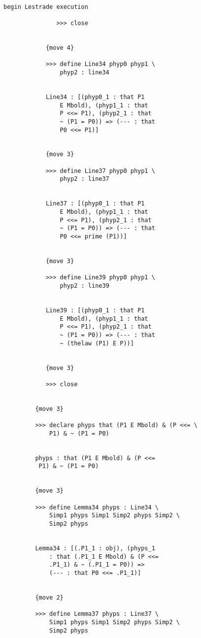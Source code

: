 \documentclass[12pt]{article}
\begin{document}
\begin{verbatim}

begin Lestrade execution

               >>> close


            {move 4}

            >>> define Line34 phyp0 phyp1 \
                phyp2 : line34


            Line34 : [(phyp0_1 : that P1 
                E Mbold), (phyp1_1 : that 
                P <<= P1), (phyp2_1 : that 
                ~ (P1 = P0)) => (--- : that 
                P0 <<= P1)]


            {move 3}

            >>> define Line37 phyp0 phyp1 \
                phyp2 : line37


            Line37 : [(phyp0_1 : that P1 
                E Mbold), (phyp1_1 : that 
                P <<= P1), (phyp2_1 : that 
                ~ (P1 = P0)) => (--- : that 
                P0 <<= prime (P1))]


            {move 3}

            >>> define Line39 phyp0 phyp1 \
                phyp2 : line39


            Line39 : [(phyp0_1 : that P1 
                E Mbold), (phyp1_1 : that 
                P <<= P1), (phyp2_1 : that 
                ~ (P1 = P0)) => (--- : that 
                ~ (thelaw (P1) E P))]


            {move 3}

            >>> close


         {move 3}

         >>> declare phyps that (P1 E Mbold) & (P <<= \
             P1) & ~ (P1 = P0)


         phyps : that (P1 E Mbold) & (P <<= 
          P1) & ~ (P1 = P0)


         {move 3}

         >>> define Lemma34 phyps : Line34 \
             Simp1 phyps Simp1 Simp2 phyps Simp2 \
             Simp2 phyps


         Lemma34 : [(.P1_1 : obj), (phyps_1 
             : that (.P1_1 E Mbold) & (P <<= 
             .P1_1) & ~ (.P1_1 = P0)) => 
             (--- : that P0 <<= .P1_1)]


         {move 2}

         >>> define Lemma37 phyps : Line37 \
             Simp1 phyps Simp1 Simp2 phyps Simp2 \
             Simp2 phyps



\end{verbatim}
\end{document}
